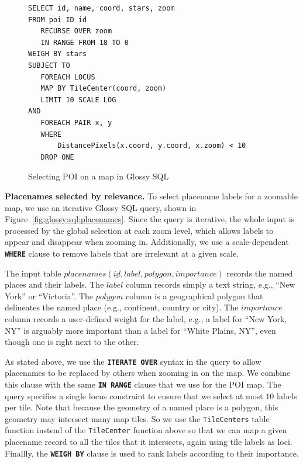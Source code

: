 \documentclass[11pt, oneside]{report}
\newcommand{\minisec}[1]{\noindent\textbf{#1.}}
\begin{document}
{%
\begin{figure}[!t]
\begin{center}
\begin{lstlisting}
SELECT id, name, coord, stars, zoom
FROM poi ID id
   RECURSE OVER zoom 
   IN RANGE FROM 18 TO 0 
WEIGH BY stars
SUBJECT TO
   FOREACH LOCUS
   MAP BY TileCenter(coord, zoom)
   LIMIT 10 SCALE LOG
AND
   FOREACH PAIR x, y
   WHERE 
       DistancePixels(x.coord, y.coord, x.zoom) < 10
   DROP ONE
\end{lstlisting}
\vspace*{-2ex}
\caption{Selecting POI on a map in Glossy SQL}
\label{fig:glossy:sql:poi}
\end{center}
\vspace*{-5ex}
\end{figure}

\minisec{Placenames selected by relevance}
To select placename labels for a zoomable map, we use an iterative Glossy SQL query, shown in Figure~\ref{fig:glossy:sql:placenames}. Since the query is iterative, the whole input is processed by the global selection at each zoom level, which allows labels to appear and disappear when zooming in. Additionally, we use a scale-dependent \textbf{\texttt{WHERE}} clause to remove labels that are irrelevant at a given scale.

The input table $placenames(\underline{id}, label, polygon, importance)$ records the named places and their labels. The $label$ column records simply a text string, e.g., ``New York'' or ``Victoria''. The $polygon$ column is a geographical polygon that delineates the named place (e.g., continent, country or city). The $importance$ column records a user-defined weight for the label, e.g., a label for ``New York, NY'' is arguably more important than a label for ``White Plains, NY'', even though one is right next to the other.

As stated above, we use the \textbf{\texttt{ITERATE OVER}} syntax in the query to allow placenames to be replaced by others when zooming in on the map. We combine this clause with the same \textbf{\texttt{IN RANGE}} clause that we use for the POI map. The query specifies a single locus constraint to ensure that we select at most $10$ labels per tile. Note that because the geometry of a named place is a polygon, this geometry may intersect many map tiles. So we use the \texttt{TileCenters} table function instead of the \texttt{TileCenter} function above so that we can map a given placename record to all the tiles that it intersects, again using tile labels as loci.  
Finallly, the \textbf{\texttt{WEIGH BY}} clause is used to rank labels according to their importance. 

}
\end{document}
